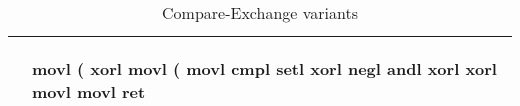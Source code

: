 \begin{table}
\begin{tabular}{|l|l|}
\begin{minipage}{3in}
\begin{verbatimtab}[2]
\end{verbatimtab}
\end{minipage} &
\begin{minipage}{3in}
\vspace{0.2in}
\begin{verbatimtab}[2]

	movl	(%
	xorl	%
	movl	(%
	movl	%
	cmpl	%
	setl	%
	xorl	%
	negl	%
	andl	%
	xorl	%
	xorl	%
	movl	%
	movl	%
	ret
	
\end{verbatimtab}
\end{minipage} \\ \hline
\end{tabular}
\caption{Compare-Exchange variants}
\label{tab:CEVariants}
\end{table}